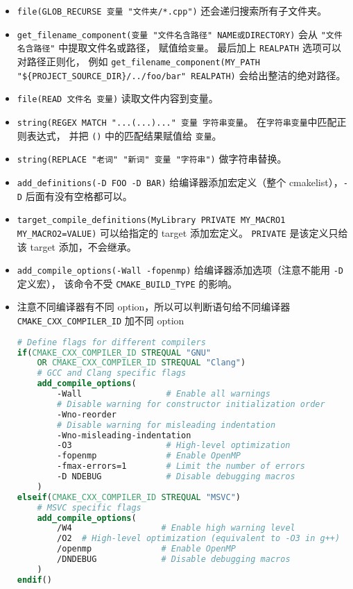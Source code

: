 \begin{itemize}
\item \verb`file(GLOB_RECURSE 变量 "文件夹/*.cpp")` 还会递归搜索所有子文件夹。
\item \verb`get_filename_component(变量 "文件名含路径" NAME或DIRECTORY)` 会从 \verb`"文件名含路径"` 中提取文件名或路径， 赋值给\verb`变量`。 最后加上 \verb`REALPATH` 选项可以对路径正则化， 例如 \verb`get_filename_component(MY_PATH "${PROJECT_SOURCE_DIR}/../foo/bar" REALPATH)` 会给出整洁的绝对路径。
\item \verb`file(READ 文件名 变量)` 读取文件内容到变量。
\item \verb`string(REGEX MATCH "...(...)..." 变量 字符串变量`。 在\verb`字符串变量`中匹配正则表达式， 并把 \verb`()` 中的匹配结果赋值给 \verb`变量`。
\item \verb`string(REPLACE "老词" "新词" 变量 "字符串")` 做字符串替换。
\item \verb`add_definitions(-D FOO -D BAR)` 给编译器添加宏定义（整个 cmakelist），\verb`-D` 后面有没有空格都可以。
\item \verb`target_compile_definitions(MyLibrary PRIVATE MY_MACRO1 MY_MACRO2=VALUE)` 可以给指定的 target 添加宏定义。 \verb`PRIVATE` 是该定义只给该 target 添加，不会继承。
\item \verb`add_compile_options(-Wall -fopenmp)` 给编译器添加选项（注意不能用 \verb`-D` 定义宏）， 该命令不受 \verb`CMAKE_BUILD_TYPE` 的影响。
\item 注意不同编译器有不同 option，所以可以判断语句给不同编译器 \verb`CMAKE_CXX_COMPILER_ID` 加不同 option
\begin{lstlisting}[language=cmake]
# Define flags for different compilers
if(CMAKE_CXX_COMPILER_ID STREQUAL "GNU"
    OR CMAKE_CXX_COMPILER_ID STREQUAL "Clang")
    # GCC and Clang specific flags
    add_compile_options(
        -Wall                 # Enable all warnings
        # Disable warning for constructor initialization order
        -Wno-reorder
        # Disable warning for misleading indentation
        -Wno-misleading-indentation
        -O3                   # High-level optimization
        -fopenmp              # Enable OpenMP
        -fmax-errors=1        # Limit the number of errors
        -D NDEBUG             # Disable debugging macros
    )
elseif(CMAKE_CXX_COMPILER_ID STREQUAL "MSVC")
    # MSVC specific flags
    add_compile_options(
        /W4                  # Enable high warning level
        /O2  # High-level optimization (equivalent to -O3 in g++)
        /openmp              # Enable OpenMP
        /DNDEBUG             # Disable debugging macros
    )
endif()

\end{lstlisting}
\end{itemize}

